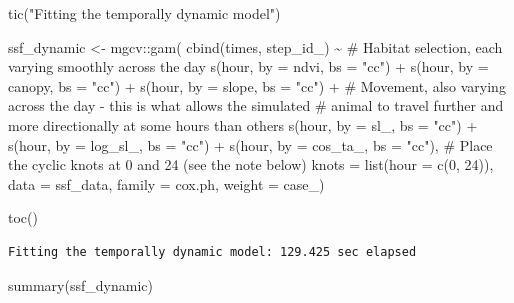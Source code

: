\documentclass[
  letterpaper,
  DIV=11,
  numbers=noendperiod]{scrartcl}
\newenvironment{Shaded}{\begin{snugshade}}{\end{snugshade}}
\newcommand{\AttributeTok}[1]{\textcolor[rgb]{0.40,0.45,0.13}{#1}}
\newcommand{\CommentTok}[1]{\textcolor[rgb]{0.37,0.37,0.37}{#1}}
\newcommand{\DecValTok}[1]{\textcolor[rgb]{0.68,0.00,0.00}{#1}}
\newcommand{\FunctionTok}[1]{\textcolor[rgb]{0.28,0.35,0.67}{#1}}
\newcommand{\NormalTok}[1]{\textcolor[rgb]{0.00,0.23,0.31}{#1}}
\newcommand{\OtherTok}[1]{\textcolor[rgb]{0.00,0.23,0.31}{#1}}
\newcommand{\SpecialCharTok}[1]{\textcolor[rgb]{0.37,0.37,0.37}{#1}}
\newcommand{\StringTok}[1]{\textcolor[rgb]{0.13,0.47,0.30}{#1}}
\begin{document}
\begin{Shaded}
\begin{Highlighting}[]
\FunctionTok{tic}\NormalTok{(}\StringTok{"Fitting the temporally dynamic model"}\NormalTok{)}

\NormalTok{ssf\_dynamic }\OtherTok{\textless{}{-}}\NormalTok{ mgcv}\SpecialCharTok{::}\FunctionTok{gam}\NormalTok{(}
  \FunctionTok{cbind}\NormalTok{(times, step\_id\_) }\SpecialCharTok{\textasciitilde{}}
    \CommentTok{\# Habitat selection, each varying smoothly across the day}
    \FunctionTok{s}\NormalTok{(hour, }\AttributeTok{by =}\NormalTok{ ndvi,    }\AttributeTok{bs =} \StringTok{"cc"}\NormalTok{) }\SpecialCharTok{+}
    \FunctionTok{s}\NormalTok{(hour, }\AttributeTok{by =}\NormalTok{ canopy,  }\AttributeTok{bs =} \StringTok{"cc"}\NormalTok{) }\SpecialCharTok{+}
    \FunctionTok{s}\NormalTok{(hour, }\AttributeTok{by =}\NormalTok{ slope,   }\AttributeTok{bs =} \StringTok{"cc"}\NormalTok{) }\SpecialCharTok{+}
    \CommentTok{\# Movement, also varying across the day {-} this is what allows the simulated}
    \CommentTok{\# animal to travel further and more directionally at some hours than others}
    \FunctionTok{s}\NormalTok{(hour, }\AttributeTok{by =}\NormalTok{ sl\_,     }\AttributeTok{bs =} \StringTok{"cc"}\NormalTok{) }\SpecialCharTok{+}
    \FunctionTok{s}\NormalTok{(hour, }\AttributeTok{by =}\NormalTok{ log\_sl\_, }\AttributeTok{bs =} \StringTok{"cc"}\NormalTok{) }\SpecialCharTok{+}
    \FunctionTok{s}\NormalTok{(hour, }\AttributeTok{by =}\NormalTok{ cos\_ta\_, }\AttributeTok{bs =} \StringTok{"cc"}\NormalTok{),}
  \CommentTok{\# Place the cyclic knots at 0 and 24 (see the note below)}
  \AttributeTok{knots  =} \FunctionTok{list}\NormalTok{(}\AttributeTok{hour =} \FunctionTok{c}\NormalTok{(}\DecValTok{0}\NormalTok{, }\DecValTok{24}\NormalTok{)),}
  \AttributeTok{data   =}\NormalTok{ ssf\_data,}
  \AttributeTok{family =}\NormalTok{ cox.ph,}
  \AttributeTok{weight =}\NormalTok{ case\_)}

\FunctionTok{toc}\NormalTok{()}
\end{Highlighting}
\end{Shaded}

\begin{verbatim}
Fitting the temporally dynamic model: 129.425 sec elapsed
\end{verbatim}

\begin{Shaded}
\begin{Highlighting}[]
\FunctionTok{summary}\NormalTok{(ssf\_dynamic)}
\end{Highlighting}
\end{Shaded}
\end{document}
